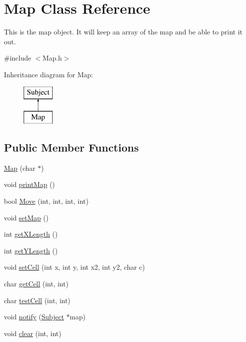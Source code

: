 \hypertarget{class_map}{\section{\-Map \-Class \-Reference}
\label{class_map}
}


\-This is the map object. \-It will keep an array of the map and be able to print it out.  




{\ttfamily \#include $<$\-Map.\-h$>$}

\-Inheritance diagram for \-Map\-:\begin{figure}[H]
\begin{center}
\leavevmode
\includegraphics[height=2.000000cm]{class_map}
\end{center}
\end{figure}
\subsection*{\-Public \-Member \-Functions}
\begin{DoxyCompactItemize}
\item 
\hyperlink{class_map_ac799bd535a5174700b11ebf7fa2c62e4}{\-Map} (char $\ast$)
\item 
void \hyperlink{class_map_a1cefc1b8ed6692667e2019f64acc0f5a}{print\-Map} ()
\item 
bool \hyperlink{class_map_af5d2cdc79ed8fb0ea8c9b8eb649a1046}{\-Move} (int, int, int, int)
\item 
void \hyperlink{class_map_adec4a268e6a6eb539595a32e7edfa27a}{set\-Map} ()
\item 
int \hyperlink{class_map_a69522ad8e85168b7288f75df1b2e9280}{get\-X\-Length} ()
\item 
int \hyperlink{class_map_a574257714fc7f50b1d9ba00c472db341}{get\-Y\-Length} ()
\item 
void \hyperlink{class_map_a001f38ef72ab960645f9e3c503d8c06b}{set\-Cell} (int x, int y, int x2, int y2, char c)
\item 
char \hyperlink{class_map_a05318be1abb0d4c230db84525d4fa5e7}{get\-Cell} (int, int)
\item 
char \hyperlink{class_map_a40733afdd2dcc7b152f17c2dd205fbb3}{test\-Cell} (int, int)
\item 
void \hyperlink{class_map_a8a0996ccb54effa9850cef39410de0f5}{notify} (\hyperlink{class_subject}{\-Subject} $\ast$map)
\item 
void \hyperlink{class_map_a4f9fcdba15fc5d1ee2594802e6ed326e}{clear} (int, int)
\end{DoxyCompactItemize}


